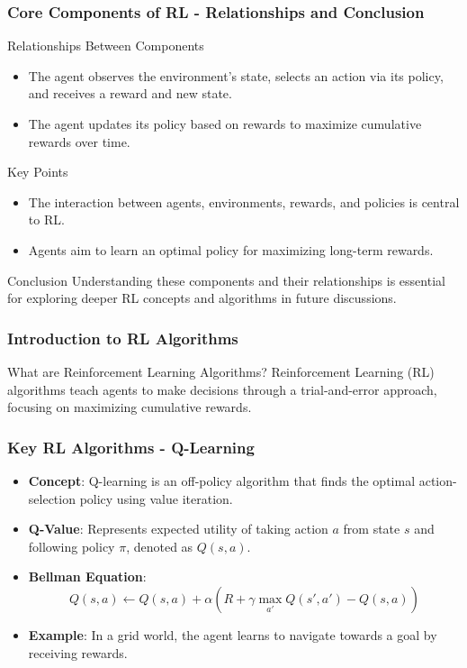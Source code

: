 \documentclass[aspectratio=169]{beamer}
\begin{document}
\begin{frame}[fragile]
    \frametitle{Core Components of RL - Relationships and Conclusion}
    \begin{block}{Relationships Between Components}
        \begin{itemize}
            \item The agent observes the environment's state, selects an action via its policy, and receives a reward and new state.
            \item The agent updates its policy based on rewards to maximize cumulative rewards over time.
        \end{itemize}
    \end{block}
    
    \begin{block}{Key Points}
        \begin{itemize}
            \item The interaction between agents, environments, rewards, and policies is central to RL.
            \item Agents aim to learn an optimal policy for maximizing long-term rewards.
        \end{itemize}
    \end{block}
    
    \begin{block}{Conclusion}
        Understanding these components and their relationships is essential for exploring deeper RL concepts and algorithms in future discussions.
    \end{block}
\end{frame}

\begin{frame}[fragile]
    \frametitle{Introduction to RL Algorithms}
    \begin{block}{What are Reinforcement Learning Algorithms?}
        Reinforcement Learning (RL) algorithms teach agents to make decisions through a trial-and-error approach, focusing on maximizing cumulative rewards.
    \end{block}
\end{frame}

\begin{frame}[fragile]
    \frametitle{Key RL Algorithms - Q-Learning}
    \begin{itemize}
        \item \textbf{Concept}: Q-learning is an off-policy algorithm that finds the optimal action-selection policy using value iteration.
        \item \textbf{Q-Value}: Represents expected utility of taking action \( a \) from state \( s \) and following policy \( \pi \), denoted as \( Q(s, a) \).
        \item \textbf{Bellman Equation}:
        \begin{equation}
            Q(s, a) \leftarrow Q(s, a) + \alpha \left( R + \gamma \max_{a'} Q(s', a') - Q(s, a) \right)
        \end{equation}
        \item \textbf{Example}: In a grid world, the agent learns to navigate towards a goal by receiving rewards.
    \end{itemize}
\end{frame}
\end{document}
